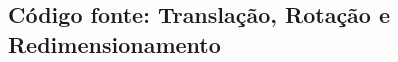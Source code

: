 \documentclass[
	article,			%
	11pt,				%
	oneside,			%
	a4paper,			%
	english,			%
	brazil,				%
	sumario=tradicional
	]{abntex2}
\newcommand{\matlabCodePath}{/home/clifte/git/Mestrado/Matlab/}
\begin{document}
 
%
%


\begin{apendicesenv} 

\chapter{Código fonte: Translação, Rotação e Redimensionamento}
\label{apend:transRotRed}

	
 	\lstset{extendedchars=true,inputencoding=utf8/latin1}
 	



\end{apendicesenv}



\end{document}
